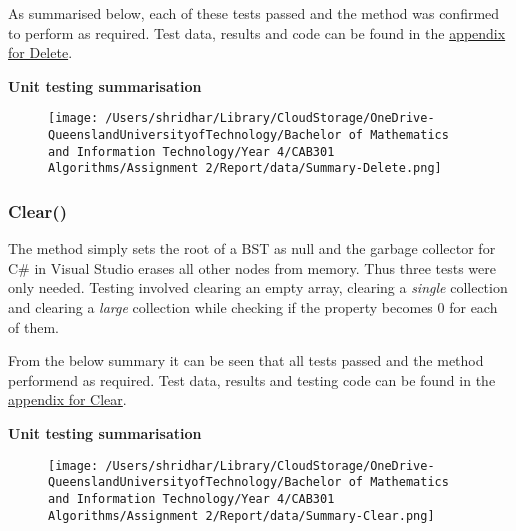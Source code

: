 \documentclass[a4paper]{article}
\begin{document}
\begin{enumerate}
\end{enumerate}
\noindent


\noindent
As summarised below, each of these tests passed and the method was confirmed to perform as required. Test data, results and code can be found in the \hyperlink{subsubsection.5.3.5}{appendix for Delete}.
\vspace{2mm}

\noindent
\textbf{Unit testing summarisation}
\begin{figure}[H]
   \texttt{[image: /Users/shridhar/Library/CloudStorage/OneDrive-QueenslandUniversityofTechnology/Bachelor of Mathematics and Information Technology/Year 4/CAB301 Algorithms/Assignment 2/Report/data/Summary-Delete.png]}
\end{figure}

\subsubsection{Clear{()}}
The  method simply sets the root of a BST as null and the garbage collector for C\# in Visual Studio erases all other nodes from memory. Thus three tests were only needed. Testing involved clearing an empty array, clearing a \textit{single} collection and clearing a \textit{large} collection while checking if the  property becomes 0 for each of them. 
\vspace{1mm}

\noindent
From the below summary it can be seen that all tests passed and the method performend as required. Test data, results and testing code can be found in the \hyperlink{subsubsection.5.3.6}{appendix for Clear}.
\vspace{2mm}

\noindent
\textbf{Unit testing summarisation}
\begin{figure}[H]
   \texttt{[image: /Users/shridhar/Library/CloudStorage/OneDrive-QueenslandUniversityofTechnology/Bachelor of Mathematics and Information Technology/Year 4/CAB301 Algorithms/Assignment 2/Report/data/Summary-Clear.png]}
\end{figure}
\end{document}
